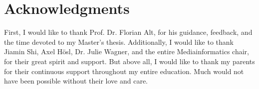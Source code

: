 
\section*{Acknowledgments}

First, I would like to thank Prof. Dr. Florian Alt, for his guidance, feedback, and the time devoted to my Master's thesis. Additionally, I would like to thank Jiamin Shi, Axel H{\"o}sl, Dr. Julie Wagner, and the entire Mediainformatics chair, for their great spirit and support. But above all, I would like to thank my parents for their continuous support throughout my entire education. Much would not have been possible without their love and care. 
